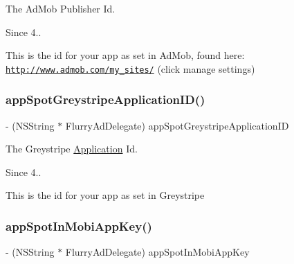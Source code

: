 The Ad\+Mob Publisher Id. 

\begin{DoxySince}{Since}
4..
\end{DoxySince}
This is the id for your app as set in Ad\+Mob, found here\+: \href{http://www.admob.com/my_sites/}{\tt http\+://www.\+admob.\+com/my\+\_\+sites/} (click manage settings) \mbox{\label{protocolFlurryAdDelegate_01-p_a10602b838acd93e710ef1aab13a20ee5}} 
\subsubsection{\texorpdfstring{app\+Spot\+Greystripe\+Application\+I\+D()}{appSpotGreystripeApplicationID()}}
{\footnotesize\ttfamily -\/ (N\+S\+String $\ast$ Flurry\+Ad\+Delegate) app\+Spot\+Greystripe\+Application\+ID \begin{DoxyParamCaption}{ }\end{DoxyParamCaption}}



The Greystripe \hyperlink{classApplication}{Application} Id. 

\begin{DoxySince}{Since}
4..
\end{DoxySince}
This is the id for your app as set in Greystripe \mbox{\label{protocolFlurryAdDelegate_01-p_ac24b29663d5da5a036df7c651eb8fa1f}} 
\subsubsection{\texorpdfstring{app\+Spot\+In\+Mobi\+App\+Key()}{appSpotInMobiAppKey()}}
{\footnotesize\ttfamily -\/ (N\+S\+String $\ast$ Flurry\+Ad\+Delegate) app\+Spot\+In\+Mobi\+App\+Key \begin{DoxyParamCaption}{ }\end{DoxyParamCaption}}



